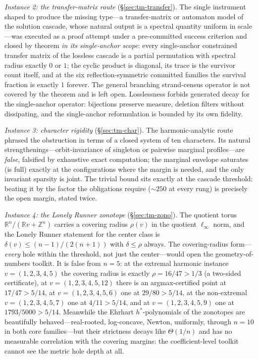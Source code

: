\documentclass[11pt,a4paper]{article}
\numberwithin{equation}{section}
\theoremstyle{plain}
\theoremstyle{definition}
\theoremstyle{remark}
\newcommand{\Z}{\mathbb{Z}}
\newcommand{\R}{\mathbb{R}}
\begin{document}
\emph{Instance 2: the transfer-matrix route} (\S\ref{sec:tm-transfer}).
The single instrument shaped to produce the missing type---a
transfer-matrix or automaton model of the solution cascade, whose natural
output is a spectral quantity uniform in scale---was executed as a proof
attempt under a pre-committed success criterion and closed by theorem
\emph{in its single-anchor scope}: every single-anchor constrained
transfer matrix of the lossless cascade is a partial
permutation with spectral radius exactly $0$ or $1$; the cyclic product is
diagonal, its trace is the survivor count itself, and at the six
reflection-symmetric committed families the survival fraction is exactly
$1$ forever. The general branching strand-census operator is not covered
by the theorem and is left open. Losslessness forbids generated decay
for the single-anchor operator: bijections preserve
measure, deletion filters without dissipating, and the single-anchor
reformulation is bounded by its own fidelity.

\emph{Instance 3: character rigidity} (\S\ref{sec:tm-char}). The
harmonic-analytic route phrased the obstruction in terms of a closed
system of ten characters. Its natural strengthenings---orbit-invariance
of singleton or pairwise marginal profiles---are \emph{false}, falsified
by exhaustive exact computation; the marginal envelope saturates (is
full) exactly at the configurations where the margin is needed, and the
only invariant sparsity is joint. The trivial bound sits exactly at the
cascade threshold: beating it by the factor the obligations require
($\sim\!250$ at every rung) is precisely the open margin, stated twice.

\emph{Instance 4: the Lonely Runner zonotope}
(\S\ref{sec:tm-zono}). The quotient torus $\R^n/(\R v+\Z^n)$ carries a
covering radius $\rho(v)$ in the quotient $\ell_\infty$ norm, and the
Lonely Runner statement for the center class is
$\delta(v)\le (n{-}1)/(2(n{+}1))$ with $\delta\le\rho$ always. The
covering-radius form---\emph{every} hole within the threshold, not just
the center---would open the geometry-of-numbers toolkit. It is false from
$n=5$: at the extremal harmonic instance $v=(1,2,3,4,5)$ the covering
radius is exactly $\rho=16/47>1/3$ (a two-sided certificate), at
$v=(1,2,3,4,5,12)$ there is an argmax-certified point at $17/47>5/14$,
at $v=(1,2,3,4,5,6)$ one at
$29/80>5/14$, at the non-extremal $v=(1,2,3,4,5,7)$ one at
$4/11>5/14$, and at $v=(1,2,3,4,5,9)$ one at $1793/5000>5/14$. Meanwhile the Ehrhart $h^*$-polynomials of the zonotopes
are beautifully behaved---real-rooted, log-concave, Newton, uniformly,
through $n=10$ in both core families---but their strictness decays like
$\Theta(1/n)$ and has no measurable correlation with the covering
margins: the coefficient-level toolkit cannot see the metric hole depth
at all.
\end{document}
